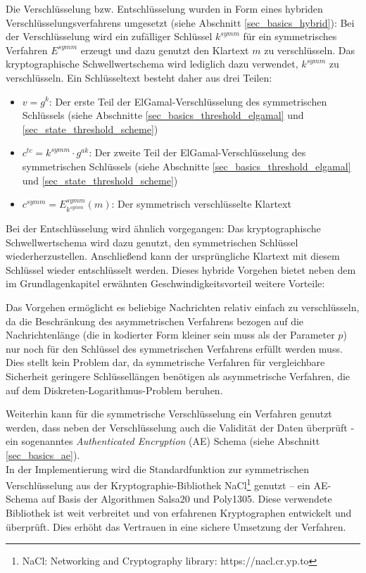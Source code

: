 Die Verschlüsselung bzw. Entschlüsselung wurden in Form eines hybriden Verschlüsselungsverfahrens umgesetzt (siehe Abschnitt \ref{sec_basics_hybrid}): Bei der Verschlüsselung wird ein zufälliger Schlüssel \(k^{symm}\) für ein symmetrisches Verfahren \(E^{symm}\) erzeugt und dazu genutzt den Klartext \(m\) zu verschlüsseln. Das kryptographische Schwellwertschema wird lediglich dazu verwendet, \(k^{symm}\) zu verschlüsseln. Ein Schlüsseltext besteht daher aus drei Teilen: 
\begin{itemize}
  \item \(v = g^k\): Der erste Teil der ElGamal-Verschlüsselung des symmetrischen Schlüssels (siehe Abschnitte \ref{sec_basics_threshold_elgamal} und \ref{sec_state_threshold_scheme})
  \item \(c^{tc} = k^{symm} \cdot g^{ak}\): Der zweite Teil der ElGamal-Verschlüsselung des symmetrischen Schlüssels (siehe Abschnitte \ref{sec_basics_threshold_elgamal} und \ref{sec_state_threshold_scheme})
  \item \(c^{symm} = E^{symm}_{k^{symm}}(m)\): Der symmetrisch verschlüsselte Klartext
\end{itemize}

Bei der Entschlüsselung wird ähnlich vorgegangen: Das kryptographische Schwellwertschema wird dazu genutzt, den symmetrischen Schlüssel wiederherzustellen. Anschließend kann der ursprüngliche Klartext mit diesem Schlüssel wieder entschlüsselt werden. Dieses hybride Vorgehen bietet neben dem im Grundlagenkapitel erwähnten Geschwindigkeitsvorteil weitere Vorteile:

Das Vorgehen ermöglicht es beliebige Nachrichten relativ einfach zu verschlüsseln, da die Beschränkung des asymmetrischen Verfahrens bezogen auf die Nachrichtenlänge (die in kodierter Form kleiner sein muss als der Parameter \(p\)) nur noch für den Schlüssel des symmetrischen Verfahrens erfüllt werden muss. Dies stellt kein Problem dar, da symmetrische Verfahren für vergleichbare Sicherheit geringere Schlüssellängen benötigen als asymmetrische Verfahren, die auf dem Diskreten-Logarithmus-Problem beruhen.

Weiterhin kann für die symmetrische Verschlüsselung ein Verfahren genutzt werden, dass neben der Verschlüsselung auch die Validität der Daten überprüft - ein sogenanntes \textit{Authenticated Encryption} (AE) Schema (siehe Abschnitt \ref{sec_basics_ae}). \\
In der Implementierung wird die Standardfunktion zur symmetrischen Verschlüsselung aus der Kryptographie-Bibliothek NaCl\footnote{
  NaCl: Networking and Cryptography library: https://nacl.cr.yp.to
} 
genutzt -- ein AE-Schema auf Basis der Algorithmen Salsa20 und Poly1305. Diese verwendete Bibliothek ist weit verbreitet und von erfahrenen Kryptographen entwickelt und überprüft. Dies erhöht das Vertrauen in eine sichere Umsetzung der Verfahren.

